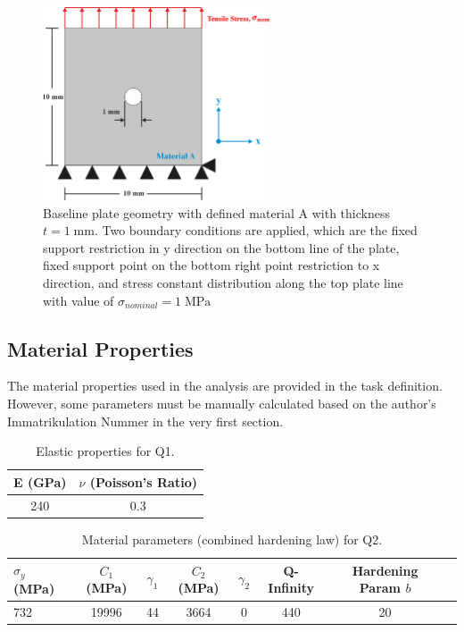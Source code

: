\documentclass[12pt]{article}
\begin{document}
\begin{figure}[H]
    \centering
    \includegraphics[width=0.6\textwidth]{images/GEO_Base.png}
    \caption{Baseline plate geometry with defined material A with thickness $t = 1 \;\text{mm}$. Two boundary conditions are applied, which are the 
        fixed support restriction in y direction on the bottom line of the plate, fixed support point on the bottom right point restriction to 
        x direction, and stress constant distribution along the top plate line with value of $\sigma_{nominal} = 1 \;\text{MPa}$}
\end{figure}

\subsection{Material Properties}
\hspace*{2em}The material properties used in the analysis are provided in the task definition. However, 
some parameters must be manually calculated based on the author's Immatrikulation Nummer in the very first section.

\begin{table}[H]
    \centering
    \caption{Elastic properties for Q1.}
    \label{tab:materialQ1-properties}
    \begin{tabular}{ll}
        \toprule
        E (GPa) & $\nu$ (Poisson's Ratio) \\
        \midrule
        \multicolumn{1}{c}{240} & \multicolumn{1}{c}{0.3} \\
        \bottomrule
    \end{tabular}
\end{table}

\begin{table}[H]
    \centering
    \caption{Material parameters (combined hardening law) for Q2.}
    \label{tab:materialQ2-properties}
    \begin{tabular}{lccccccc}
        \toprule
        $\sigma_y$ (MPa) & $C_1$ (MPa) & $\gamma_1$ & $C_2$ (MPa) & $\gamma_2$ & Q-Infinity & Hardening Param $b$ \\
        \midrule
        732 & 19996 & 44 & 3664 & 0 & 440 & 20 \\
        \bottomrule
    \end{tabular}
\end{table}
\end{document}
